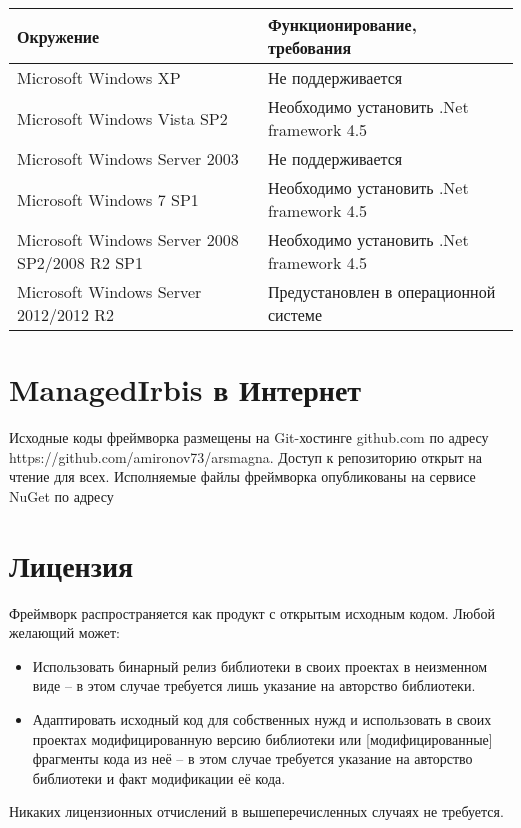 \begin{table}[htbp]
\centering
\begin{tabular}{ | p{6cm} | p{6cm} | }
\hline
\textbf{Окружение} & \textbf{Функционирование, требования} \\
\hline
Microsoft Windows XP & Не поддерживается \\
\hline
Microsoft Windows Vista SP2 & Необходимо установить .Net framework 4.5 \\
\hline
Microsoft Windows Server 2003 & Не поддерживается \\
\hline
Microsoft Windows 7 SP1 & Необходимо установить .Net framework 4.5 \\
\hline
Microsoft Windows Server 2008 SP2/2008 R2 SP1 & Необходимо установить .Net framework 4.5 \\
\hline
Microsoft Windows Server 2012/2012 R2 & Предустановлен в операционной системе \\
\hline
\end{tabular}
\end{table}

\section*{ManagedIrbis в Интернет}

Исходные коды фреймворка размещены на Git-хостинге github.com по адресу https://github.com/amironov73/arsmagna. Доступ к репозиторию открыт на чтение для всех.
Исполняемые файлы фреймворка опубликованы на сервисе NuGet по адресу

\section*{Лицензия}

Фреймворк распространяется как продукт с открытым исходным кодом. Любой желающий может:

\begin{itemize}
	\item Использовать бинарный релиз библиотеки в своих проектах в неизменном виде – в этом случае требуется лишь указание на авторство библиотеки.
	\item Адаптировать исходный код для собственных нужд и использовать в своих проектах модифицированную версию библиотеки или [модифицированные] фрагменты кода из неё – в этом случае требуется указание на авторство библиотеки и факт модификации её кода.
\end{itemize}

Никаких лицензионных отчислений в вышеперечисленных случаях не требуется. 

